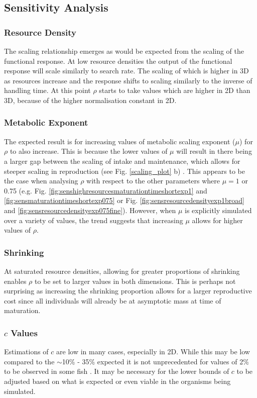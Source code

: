 \documentclass[a4paper, 11pt, hidelinks]{article} %
\begin{document}
	
	\subsection{Sensitivity Analysis}
	\subsubsection{Resource Density}
	The scaling relationship emerges as would be expected from the scaling of the functional response.  At low resource densities the output of the functional response will scale similarly to search rate.  The scaling of which is higher in 3D as resources increase and the response shifts to scaling similarly to the inverse of handling time.  At this point $\rho$ starts to take values which are higher in 2D than 3D, because of the higher normalisation constant in 2D.
	
	\subsubsection{Metabolic Exponent}
	The expected result is for increasing values of metabolic scaling exponent ($\mu$) for $\rho$ to also increase.  This is because the lower values of $\mu$ will result in there being a larger gap between the scaling of intake and maintenance, which allows for steeper scaling in reproduction (see Fig. \ref{scaling_plot} b) \parencite{Marshall2019}.  This appears to be the case when analysing $\rho$ with respect to the other parameters where $\mu = 1$ or 0.75 (e.g. Fig. \ref{fig:senshighresourcesmaturationtimeshortexp1} and \ref{fig:sensmaturationtimeshortexp075} or Fig. \ref{fig:sensresourcedensityexp1broad} and \ref{fig:sensresourcedensityexp075fine}).  However, when $\mu$ is explicitly simulated over a variety of values, the trend suggests that increasing $\mu$ allows for higher values of $\rho$.  
	
	\subsubsection{Shrinking}
	At saturated resource densities, allowing for greater proportions of shrinking enables $\rho$ to be set to larger values in both dimensions.  This is perhaps not surprising as increasing the shrinking proportion allows for a larger reproductive cost since all individuals will already be at asymptotic mass at time of maturation.
	
	\subsubsection{$c$ Values}
	Estimations of $c$ are low in many cases, especially in 2D.  While this may be low compared to the $\sim$10\% - 35\% expected \parencite{Benoit2018, Fontoura2009, Roff1983} it is not unprecedented for values of 2\% to be observed in some fish \parencite{Gunderson1997}.  It may be necessary for the lower bounds of $c$ to be adjusted based on what is expected or even viable in the organisms being simulated.
	
\end{document}
